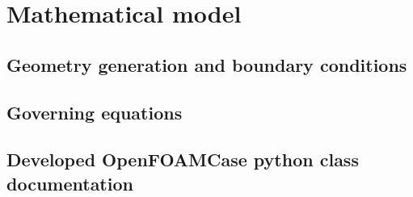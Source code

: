 \cleardoublepage
\section{Mathematical model}
\label{sec:mathMod}


\subsection{Geometry generation and boundary conditions}
\label{subsec:geomGen}


\subsection{Governing equations}
\label{subsec:govEq}


\subsection{Developed OpenFOAMCase python class documentation}
\label{subsec:ofCaseClass}
